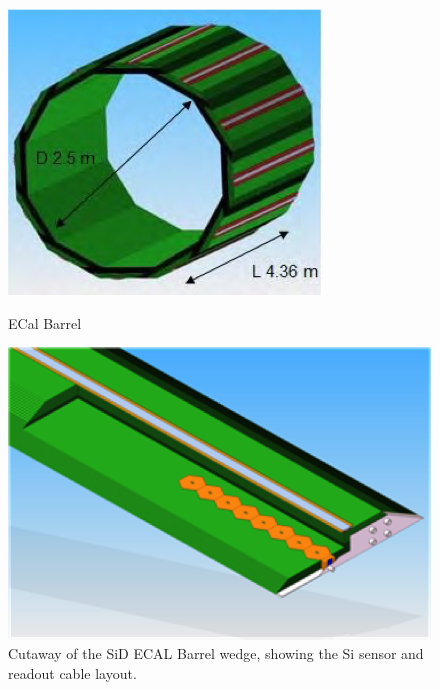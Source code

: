\begin{figure}
	\centering
	\hspace*{\fill}
	\begin{minipage}[b]{.35\textwidth}
		\includegraphics[width=\linewidth,valign=t]{Calorimeter/SiliconTungstenSiD/ECalBarrel.png}
		\caption{ECal Barrel}
		\label{fig:Calorimeter:SiDECAL:ECalBarrel}
	\end{minipage}\hfill
	\begin{minipage}[b]{.43\textwidth}
		\includegraphics[width=\linewidth,valign=t]{Calorimeter/SiliconTungstenSiD/wedge.png}
		\caption{Cutaway of the SiD ECAL Barrel wedge,
showing the Si sensor and readout cable layout.}
		\label{fig:Calorimeter:SiDECAL:wedge}
	\end{minipage}
	\hspace*{\fill}
\end{figure}

